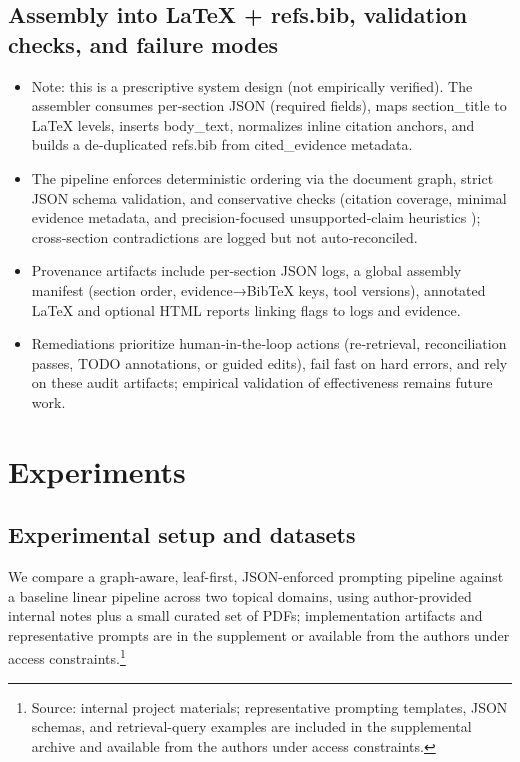 \documentclass{article}%
\providecommand{\tightlist}{}%
\begin{document}
%
\subsection{Assembly into LaTeX + refs.bib, validation checks, and failure modes}%


%
\begin{itemize}
\tightlist
\item
  Note: this is a prescriptive system design (not empirically verified). The assembler consumes per‑section JSON (required fields), maps section\_title to LaTeX levels, inserts body\_text, normalizes inline citation anchors, and builds a de‑duplicated refs.bib from cited\_evidence metadata.
\item
  The pipeline enforces deterministic ordering via the document graph, strict JSON schema validation, and conservative checks (citation coverage, minimal evidence metadata, and precision‑focused unsupported‑claim heuristics \cite{2510.20303v1}); cross‑section contradictions are logged but not auto‑reconciled.
\item
  Provenance artifacts include per‑section JSON logs, a global assembly manifest (section order, evidence→BibTeX keys, tool versions), annotated LaTeX and optional HTML reports linking flags to logs and evidence.
\item
  Remediations prioritize human‑in‑the‑loop actions (re‑retrieval, reconciliation passes, TODO annotations, or guided edits), fail fast on hard errors, and rely on these audit artifacts; empirical validation of effectiveness remains future work.
\end{itemize}%

%
\section{Experiments}%
\subsection{Experimental setup and datasets}%


%
We compare a graph-aware, leaf-first, JSON-enforced prompting pipeline against a baseline linear pipeline across two topical domains, using author-provided internal notes plus a small curated set of PDFs; implementation artifacts and representative prompts are in the supplement or available from the authors under access constraints.\footnote{Source: internal project materials; representative prompting templates, JSON schemas, and retrieval-query examples are included in the supplemental archive and available from the authors under access constraints.}
\end{document}
